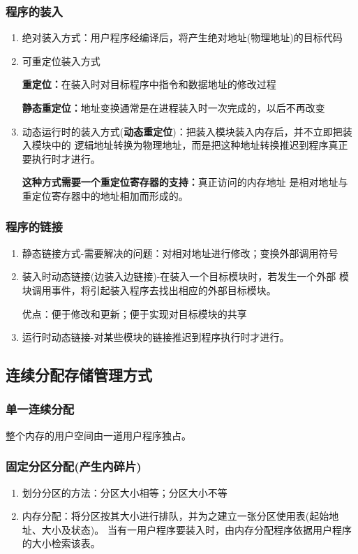 \documentclass{article}
\begin{document}
\subsubsection{\color{red}程序的装入}
\begin{enumerate}
    \item 绝对装入方式：用户程序经编译后，将产生绝对地址(物理地址)的目标代码
    \item 可重定位装入方式
    
    \textbf{重定位：}在装入时对目标程序中指令和数据地址的修改过程

    \textbf{静态重定位：}地址变换通常是在进程装入时一次完成的，以后不再改变

    \item 动态运行时的装入方式(\label{动态重定位}\textbf{动态重定位})：把装入模块装入内存后，并不立即把装入模块中的
    逻辑地址转换为物理地址，而是把这种地址转换推迟到程序真正要执行时才进行。
    
    \textbf{这种方式需要一个重定位寄存器的支持：}真正访问的内存地址
    是相对地址与重定位寄存器中的地址相加而形成的。
\end{enumerate}

\subsubsection{\color{red}程序的链接}
\begin{enumerate}
    \item 静态链接方式-需要解决的问题：对相对地址进行修改；变换外部调用符号
    \item 装入时动态链接(边装入边链接)-在装入一个目标模块时，若发生一个外部
    模块调用事件，将引起装入程序去找出相应的外部目标模块。
    
    优点：便于修改和更新；便于实现对目标模块的共享
    \item 运行时动态链接-对某些模块的链接推迟到程序执行时才进行。
\end{enumerate}

\subsection{\color{red}连续分配存储管理方式 }
\subsubsection{\color{red}单一连续分配}
整个内存的用户空间由一道用户程序独占。
\vspace*{-0.4cm}
\subsubsection{\color{red}固定分区分配(产生内碎片)}
\begin{enumerate}
    \item 划分分区的方法：分区大小相等；分区大小不等
    \item 内存分配：将分区按其大小进行排队，并为之建立一张分区使用表(起始地址、大小及状态)。
    当有一用户程序要装入时，由内存分配程序依据用户程序的大小检索该表。
\end{enumerate}
\end{document}
